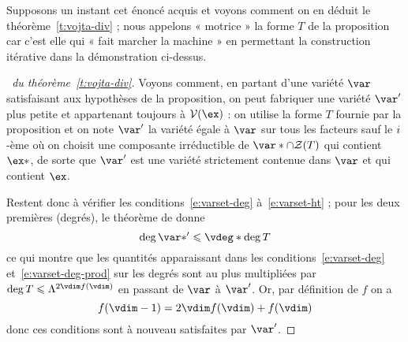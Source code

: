 Supposons un instant cet énoncé acquis et voyons comment on en déduit le
théorème~\ref{t:vojta-div} ; nous appelons « motrice » la forme \( T \) de la
proposition car c'est elle qui « fait marcher la machine » en permettant la
construction itérative dans la démonstration ci-dessus.

\begin{proof}[\proofname\ du théorème~\ref{t:vojta-div}]
  Voyons comment, en partant d'une variété \( \var \) satisfaisant aux
  hypothèses de la proposition, on peut fabriquer une variété \( \var' \) plus
  petite et appartenant toujours à \( \varset(\ex) \) : on utilise la forme
  \( T \) fournie par la proposition et on note
  \( \var' \) la variété égale à \( \var \) sur tous les facteurs sauf le \(
    i \)-ème où on choisit une composante irréductible de
  \( \var* \cap \zeros T \) qui contient \( \ex* \), de sorte que \( \var' \)
  est une variété strictement contenue dans \( \var \) et qui contient \( \ex
  \).

  Restent donc à vérifier les conditions~\eqref{e:varset-deg}
  à~\eqref{e:varset-ht} ; pour les deux premières (degrés), le théorème de
   donne
  \begin{equation}
    \deg \var*' \le \vdeg* \deg T
  \end{equation}
  ce qui montre que les quantités apparaissant dans les
  conditions~\eqref{e:varset-deg} et~\eqref{e:varset-deg-prod} sur les degrés
  sont au plus multipliées par \( \deg T \le \Lambda^{2\vdim f(\vdim)} \) en
  passant de \( \var \) à \( \var' \). Or, par définition de \( f \) on a
  \begin{equation} \label{e:ct-f}
    f(\vdim-1) = 2\vdim f(\vdim) + f(\vdim)
  \end{equation}
  donc ces conditions sont à nouveau satisfaites par \( \var' \).


\end{proof}
